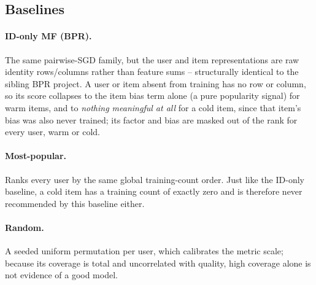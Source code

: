 \subsection{Baselines}

\paragraph{ID-only MF (BPR).} The same pairwise-SGD family, but the user and
item representations are raw identity rows/columns rather than feature
sums -- structurally identical to the sibling BPR project. A user or item
absent from training has no row or column, so its score collapses to the
item bias term alone (a pure popularity signal) for warm items, and to
\emph{nothing meaningful at all} for a cold item, since that item's bias was
also never trained; its factor and bias are masked out of the rank for every
user, warm or cold.

\paragraph{Most-popular.} Ranks every user by the same global training-count
order. Just like the ID-only baseline, a cold item has a training count of
exactly zero and is therefore never recommended by this baseline either.

\paragraph{Random.} A seeded uniform permutation per user, which calibrates
the metric scale; because its coverage is total and uncorrelated with
quality, high coverage alone is not evidence of a good model.
